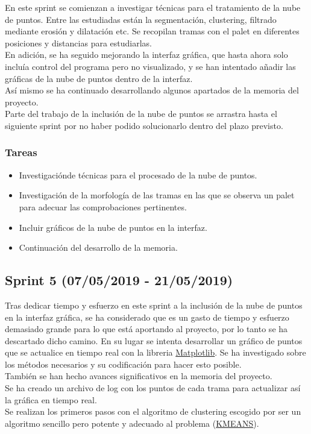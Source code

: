 En este sprint se comienzan a investigar técnicas para el tratamiento de la nube de puntos. Entre las estudiadas están la segmentación, clustering, filtrado mediante erosión y dilatación etc. Se recopilan tramas con el palet en diferentes posiciones y distancias para estudiarlas.\\
En adición, se ha seguido mejorando la interfaz gráfica, que hasta ahora solo incluía control del programa pero no visualizado, y se han intentado añadir las gráficas de la nube de puntos dentro de la interfaz.\\ Así mismo se ha continuado desarrollando algunos apartados de la memoria del proyecto. \\ Parte del trabajo de la inclusión de la nube de puntos se arrastra hasta el siguiente sprint por no haber podido solucionarlo dentro del plazo previsto.



\subsubsection{Tareas}
\begin{itemize}
\item Investigaciónde técnicas para el procesado de la nube de puntos.
\item Investigación de la morfología de las tramas en las que se observa un palet para adecuar las comprobaciones pertinentes.
\item Incluir gráficos de la nube de puntos en la interfaz.
\item Continuación del desarrollo de la memoria.

\end{itemize}


\subsection{Sprint 5 (07/05/2019 - 21/05/2019)}

Tras dedicar tiempo y esfuerzo en este sprint a la inclusión de la nube de puntos en la interfaz gráfica, se ha considerado que es un gasto de tiempo y esfuerzo demasiado grande para lo que está aportando al proyecto, por lo tanto se ha descartado dicho camino. En su lugar se intenta desarrollar un gráfico de puntos que se actualice en tiempo real con la libreria \href{https://matplotlib.org/}{Matplotlib}. Se ha investigado sobre los métodos necesarios y su codificación para hacer esto posible.\\ También se han hecho avances significativos en la memoria del proyecto.\\ Se ha creado un archivo de log con los puntos de cada trama para actualizar así la gráfica en tiempo real. \\ Se realizan los primeros pasos con el algoritmo de clustering escogido por ser un algoritmo sencillo pero potente y adecuado al problema (\href{https://es.wikipedia.org/wiki/K-medias}{KMEANS}).



